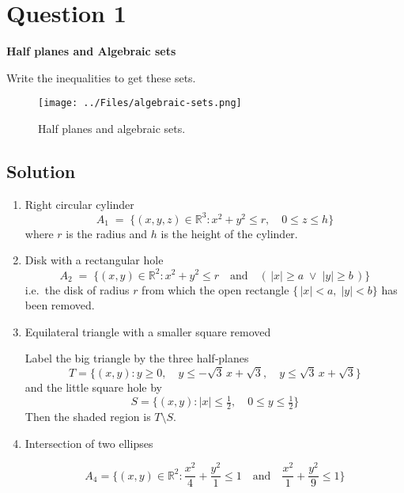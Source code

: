 \section*{Question 1}

\textbf{Half planes and Algebraic sets}

Write the inequalities to get these sets.

\begin{figure}[htbp]
    \centering
    \texttt{[image: ../Files/algebraic-sets.png]}
    \vspace*{-2em}
    \caption{
        Half planes and algebraic sets.
    }\label{fig:q1}
\end{figure}

\subsection*{Solution}

\begin{enumerate}[noitemsep, topsep=0pt, leftmargin=10pt]
    \item Right circular cylinder
          \[
              A_1 \;=\;\bigl\{(x,y,z)\in\mathbb R^3 : x^2 + y^2 \le r,\quad 0 \le z \le h \bigr\}
          \]
          where \( r \) is the radius and \( h \) is the height of the cylinder.

    \item Disk with a rectangular hole
          \[
              A_2 \;=\;\bigl\{(x,y)\in\mathbb R^2 : x^2 + y^2 \le r
              \quad\text{and}\quad
              (\,|x|\ge a\;\lor\;|y|\ge b\,)\bigr\}
          \]
          i.e.\ the disk of radius \( r \) from which the open rectangle $\{\,|x|<a,\;|y|<b\}$ has been removed.

    \item Equilateral triangle with a smaller square removed

          Label the big triangle by the three half‐planes
          \[
              T = \bigl\{(x,y):
              y \ge 0,\quad
              y \le -\sqrt3\,x + \sqrt3,\quad
              y \le \sqrt3\,x + \sqrt3
              \bigr\}
          \]
          and the little square hole by
          \[
              S = \bigl\{(x,y):
              |x|\le \tfrac12,\quad 0 \le y \le \tfrac12
              \bigr\}
          \]
          Then the shaded region is \( T\setminus S \).

    \item Intersection of two ellipses

          \[
              A_4 = \bigl\{(x,y)\in\mathbb R^2 :
              \frac{x^2}{4} + \frac{y^2}{1} \le 1
              \quad\text{and}\quad
              \frac{x^2}{1} + \frac{y^2}{9} \le 1
              \bigr\}
          \]
\end{enumerate}

